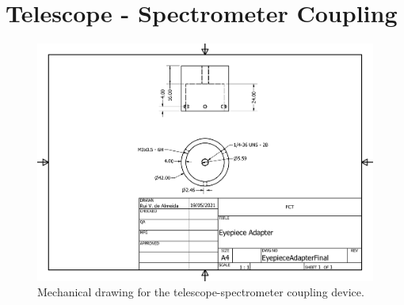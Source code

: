 \chapter{Telescope - Spectrometer Coupling}
\label{ap:technical_drawing_telescope_spectrometer_coupling}

\begin{figure}[htpb]
    \centering
    \includegraphics[width=1.5\linewidth, angle=90,origin=c]{img/pdf/EyepieceAdapterFinal.pdf}
    \caption{Mechanical drawing for the telescope-spectrometer coupling
    device.}%
    \label{fig:mech_dwg_spttel_coupling}
\end{figure}
